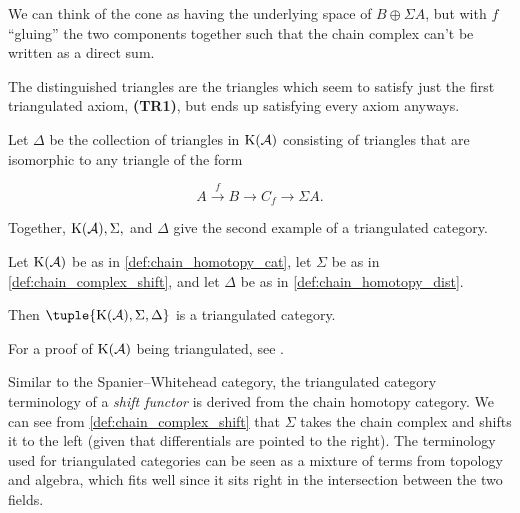 We can think of the cone as having the underlying space of \( B \oplus \Sigma A \), but with \( f \) ``gluing'' the two components together such that the chain complex can't be written as a direct sum.

The distinguished triangles are the triangles which seem to satisfy just the first triangulated axiom, {\bf (TR1)}, but ends up satisfying every axiom anyways.

\begin{definition}
    \label{def:chain_homotopy_dist}
    Let \( \Delta \) be the collection of triangles in \( \operatorname{K}({\mathcal{A}}) \) consisting of triangles that are isomorphic to any triangle of the form

    \[
        A \stackrel{f}{\to} B \to C_f \to \Sigma A.
    \]
\end{definition}

Together, \( \operatorname{K}({\mathcal{A}}), \Sigma, \) and \( \Delta \) give the second example of a triangulated category.

\begin{example}
    Let \( \operatorname{K}({\mathcal{A}}) \) be as in \autoref{def:chain_homotopy_cat}, let \( \Sigma \) be as in \autoref{def:chain_complex_shift}, and let \( \Delta \) be as in \autoref{def:chain_homotopy_dist}.

    Then \( \tuple{\K(\Ac), \Sigma, \Delta} \) is a triangulated category.
\end{example}
For a proof of \( \operatorname{K}({\mathcal{A}}) \) being triangulated, see \cite[Proposition 3.5.25]{Zimmermann_2014}.

Similar to the Spanier--Whitehead category, the triangulated category terminology of a \emph{shift functor} is derived from the chain homotopy category. We can see from \autoref{def:chain_complex_shift} that \( \Sigma \) takes the chain complex and shifts it to the left (given that differentials are pointed to the right). The terminology used for triangulated categories can be seen as a mixture of terms from topology and algebra, which fits well since it sits right in the intersection between the two fields.
